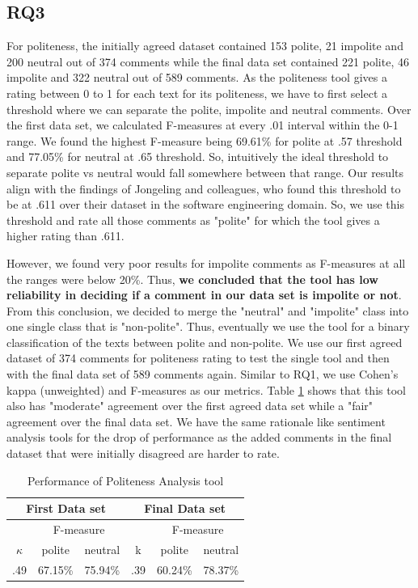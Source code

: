 \subsection{RQ3}

For politeness, the initially agreed dataset contained 153 polite, 21 impolite and 200 neutral out of 374 comments while the final data set contained 221 polite, 46 impolite and 322 neutral out of 589 comments. As 
the politeness tool
gives a rating between 0 to 1 for each text for its politeness, we have to first select a threshold where we can separate the polite, impolite and neutral comments. Over the first data set, we calculated F-measures at every .01 interval within the 0-1 range. We found the highest F-measure being 69.61\%  for polite at .57 threshold and 77.05\% for neutral at .65 threshold. So, intuitively the ideal threshold to separate polite vs neutral would fall somewhere between that range. Our results align with the findings of Jongeling and colleagues, who found this threshold to be at .611 over their dataset in the software engineering domain. So, we use this threshold and rate all those comments as "polite" for which the tool gives a higher rating than .611.

However, we found 
very poor results
for impolite comments as F-measures at all the ranges were below 20\%. Thus, \textbf{we concluded that the tool has low reliability in deciding if a comment in our data set is impolite or not}. From this conclusion, we decided to merge the "neutral" and "impolite" class into one single class that is "non-polite". Thus, eventually we use the tool for a binary classification of the texts between polite and non-polite.
We use our first agreed dataset of 374 comments for politeness rating to test the single tool and then with the final data set of 589 comments again. Similar to RQ1, we use Cohen's kappa (unweighted) and F-measures as our metrics. Table \ref{polresult} shows that this tool also has "moderate" agreement over the first agreed data set while a "fair" agreement over the final data set. We have the same rationale like sentiment analysis tools for the drop of performance as the added comments in the final dataset that were initially disagreed are harder to rate.  

\vspace{3mm}
\noindent{}

\begin{table}
\centering
\caption{Performance of Politeness Analysis tool}
\label{polresult}
\begin{tabular}{|c|c|c|c|c|c|}
\hline
\multicolumn{3}{|c|}{ First Data set }& \multicolumn{3}{c|}{ Final Data set } \\
\hline
 & \multicolumn{2}{c|}{ F-measure } & & \multicolumn{2}{c|}{ F-measure } \\
 \hline
$\kappa$ & polite & neutral & k & polite & neutral \\
\hline
.49 & 67.15\% & 75.94\% & .39 & 60.24\% & 78.37\%\\
\hline
\end{tabular}
\end{table}

